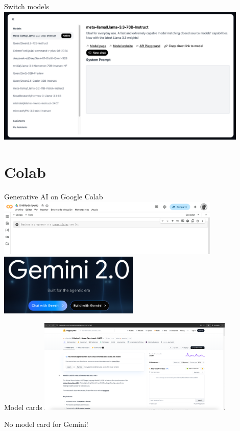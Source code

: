 \documentclass[t,xcolor={dvipsnames},final,aspectratio=169]{beamer}
\begin{document}
\begin{frame}{Switch models}
\includegraphics[width=0.9\textwidth]{img/models.png}
\end{frame}

\section{Colab}
{
\begin{frame}{Generative AI on Google Colab}
\includegraphics[width=0.8\textwidth]{img/colab.png}
\pause
\vfill
\includegraphics[width=0.5\textwidth]{img/gemini.png}
\end{frame}
}

\begin{frame}{Model cards}
\includegraphics[width=0.7\textwidth]{img/modelcard.png}
\pause

No model card for Gemini!
\end{frame}
\end{document}
